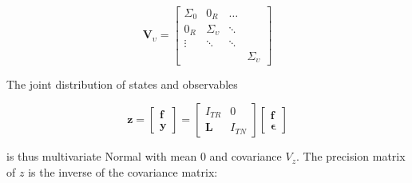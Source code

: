 \documentclass[notitlepage,a4paper,12pt]{article}
\begin{document}
$$
\mathbf{V}_{\upsilon} = 
\begin{bmatrix}
    \Sigma_{0} & 0_R & \dots \\
    0_R & \Sigma_{\upsilon} & \ddots \\
    \vdots & \ddots & \ddots \\
    & & & \Sigma_{\upsilon} 
\end{bmatrix}
$$

The joint distribution of states and observables

\begin{equation}
    \mathbf{z} = 
    \begin{bmatrix}
        \mathbf{f} \\
        \mathbf{y}
    \end{bmatrix}
    = 
    \begin{bmatrix}
        I_{TR} & 0 \\
        \mathbf{L} & I_{TN} 
    \end{bmatrix}
    \begin{bmatrix}
        \mathbf{f} \\
        \mathbf{\epsilon}
    \end{bmatrix} 
\end{equation}

is thus multivariate Normal with mean 0 and covariance $V_z$. The precision matrix of $z$ is the inverse of the covariance matrix: 
\end{document}
